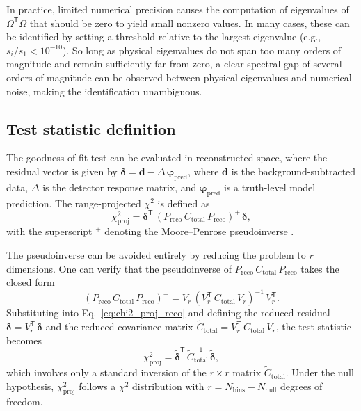\documentclass[a4paper,11pt]{article}
\begin{document}
In practice, limited numerical precision causes the computation of eigenvalues of $\Omega^{\mathsf{T}} \Omega$ that should be zero to yield small nonzero values. In many cases, these can be identified by setting a threshold relative to the largest eigenvalue (e.g., $s_{i} / s_{1} < 10^{-10}$). So long as physical eigenvalues do not span too many orders of magnitude and remain sufficiently far from zero, a clear spectral gap of several orders of magnitude can be observed between physical eigenvalues and numerical noise, making the identification unambiguous.

\subsection{Test statistic definition}
\label{subsec:chi2_definition}

The goodness-of-fit test can be evaluated in reconstructed space, where the residual vector is given by $\boldsymbol{\delta} = \mathbf{d} - \Delta \, \boldsymbol{\varphi}_{\text{pred}}$, where $\mathbf{d}$ is the background-subtracted data, $\Delta$ is the detector response matrix, and $\boldsymbol{\varphi}_{\text{pred}}$ is a truth-level model prediction. The range-projected $\chi^{2}$ is defined as
\begin{equation}\label{eq:chi2_proj_reco}
    \chi^2_{\text{proj}} = \boldsymbol{\delta}^{\mathsf{T}} \, ( P_{\text{reco}} \, C_{\text{total}} \, P_{\text{reco}} )^{+} \, \boldsymbol{\delta},
\end{equation}
with the superscript $^+$ denoting the Moore--Penrose pseudoinverse \cite{Penrose:1955vy}.

The pseudoinverse can be avoided entirely by reducing the problem to $r$ dimensions. One can verify that the pseudoinverse of $P_{\text{reco}} \, C_{\text{total}} \, P_{\text{reco}}$ takes the
closed form
\begin{equation}\label{eq:pinv_reco}
    ( P_{\text{reco}} \, C_{\text{total}} \, P_{\text{reco}} )^{+} = V_r \, (V_r^{\mathsf{T}} \, C_{\text{total}} \, V_r)^{-1} \, V_r^{\mathsf{T}}.
\end{equation}
Substituting into Eq.~\eqref{eq:chi2_proj_reco} and defining the reduced residual $\tilde{\boldsymbol{\delta}} = V_r^{\mathsf{T}} \, \boldsymbol{\delta}$ and the reduced covariance matrix $\tilde{C}_{\text{total}} = V_r^{\mathsf{T}} \, C_{\text{total}} \, V_r$, the test statistic becomes
\begin{equation}\label{eq:chi2_reduced}
    \chi^2_{\text{proj}} = \tilde{\boldsymbol{\delta}}^{\mathsf{T}} \, \tilde{C}_{\text{total}}^{-1} \, \tilde{\boldsymbol{\delta}},
\end{equation}
which involves only a standard inversion of the $r \times r$ matrix $\tilde{C}_{\text{total}}$. Under the null hypothesis, $\chi^2_{\text{proj}}$ follows a $\chi^2$ distribution with $r = N_{\text{bins}} - N_{\text{null}}$ degrees of freedom.
\end{document}
